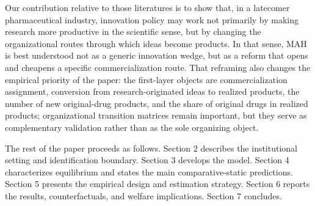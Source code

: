 Our contribution relative to those literatures is to show that, in a latecomer pharmaceutical industry, innovation policy may work not primarily by making research more productive in the scientific sense, but by changing the organizational routes through which ideas become products. In that sense, MAH is best understood not as a generic innovation wedge, but as a reform that opens and cheapens a specific commercialization route. That reframing also changes the empirical priority of the paper: the first-layer objects are commercialization assignment, conversion from research-originated ideas to realized products, the number of new original-drug products, and the share of original drugs in realized products; organizational transition matrices remain important, but they serve as complementary validation rather than as the sole organizing object.

The rest of the paper proceeds as follows. Section 2 describes the institutional setting and identification boundary. Section 3 develops the model. Section 4 characterizes equilibrium and states the main comparative-static predictions. Section 5 presents the empirical design and estimation strategy. Section 6 reports the results, counterfactuals, and welfare implications. Section 7 concludes.
